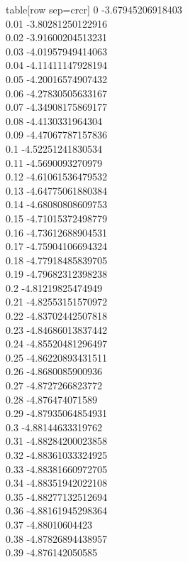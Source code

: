   table[row sep=crcr]{%
0	-3.67945206918403\\
0.01	-3.80281250122916\\
0.02	-3.91600204513231\\
0.03	-4.01957949414063\\
0.04	-4.11411147928194\\
0.05	-4.20016574907432\\
0.06	-4.27830505633167\\
0.07	-4.34908175869177\\
0.08	-4.4130331964304\\
0.09	-4.47067787157836\\
0.1	-4.52251241830534\\
0.11	-4.5690093270979\\
0.12	-4.61061536479532\\
0.13	-4.64775061880384\\
0.14	-4.68080808609753\\
0.15	-4.71015372498779\\
0.16	-4.73612688904531\\
0.17	-4.75904106694324\\
0.18	-4.77918485839705\\
0.19	-4.79682312398238\\
0.2	-4.81219825474949\\
0.21	-4.82553151570972\\
0.22	-4.83702442507818\\
0.23	-4.84686013837442\\
0.24	-4.85520481296497\\
0.25	-4.86220893431511\\
0.26	-4.8680085900936\\
0.27	-4.8727266823772\\
0.28	-4.876474071589\\
0.29	-4.87935064854931\\
0.3	-4.88144633319762\\
0.31	-4.88284200023858\\
0.32	-4.88361033324925\\
0.33	-4.88381660972705\\
0.34	-4.88351942022108\\
0.35	-4.88277132512694\\
0.36	-4.88161945298364\\
0.37	-4.88010604423\\
0.38	-4.87826894438957\\
0.39	-4.876142050585\\
}
